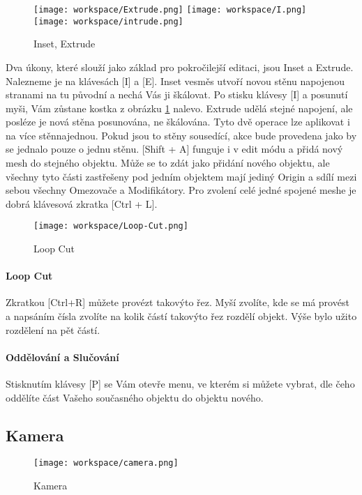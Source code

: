 \documentclass[12pt,a4paper]{report}
\begin{document}
	\begin{figure}[h]
		\centering
		\texttt{[image: workspace/Extrude.png]}
		\texttt{[image: workspace/I.png]}
		\texttt{[image: workspace/intrude.png]}
		\caption{Inset, Extrude}
		\label{pic:edit-actions}
	\end{figure}

	Dva úkony, které slouží jako základ pro pokročilejší editaci, jsou Inset a
	Extrude. Nalezneme je na klávesách [I] a [E]. Inset vesměs utvoří novou
	stěnu napojenou stranami na tu původní a nechá Vás ji škálovat. Po
	stisku klávesy [I] a posunutí myši, Vám zůstane kostka z obrázku \ref{pic:edit-actions}
	nalevo. Extrude udělá stejné napojení, ale posléze je nová stěna
	posunována, ne škálována. Tyto dvě operace lze aplikovat i na více stěnnajednou. Pokud jsou to stěny sousedící, akce bude provedena jako by se
	jednalo pouze o jednu stěnu.
	[Shift + A] funguje i v edit módu a přidá nový mesh do stejného objektu.
	Může se to zdát jako přidání nového objektu, ale všechny tyto části
	zastřešeny pod jedním objektem mají jediný Origin a sdílí mezi sebou
	všechny Omezovače a Modifikátory. Pro zvolení celé jedné spojené meshe
	je dobrá klávesová zkratka [Ctrl + L].
	
	\begin{figure}[h]
		\centering
		\texttt{[image: workspace/Loop-Cut.png]}
		\caption{Loop Cut}
		\label{pic:loop-cut}
	\end{figure}

	\paragraph{Loop Cut} Zkratkou [Ctrl+R] můžete provézt takovýto řez. Myší zvolíte,
	kde se má provést a napsáním čísla zvolíte na kolik částí takovýto řez
	rozdělí objekt. Výše bylo užito rozdělení na pět částí.
	
	\paragraph{Oddělování a Slučování} Stisknutím klávesy [P] se Vám otevře menu,
	ve kterém si můžete vybrat, dle čeho oddělíte část Vašeho současného
	objektu do objektu nového.
	
	\subsection{Kamera}
	
	\begin{figure}[h]
		\centering
		\texttt{[image: workspace/camera.png]}
		\caption{Kamera}
		\label{pic:camera}
	\end{figure}
\end{document}
